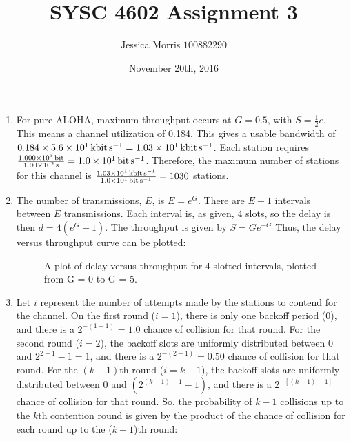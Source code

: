 \documentclass{article}
\title{SYSC 4602 Assignment 3}
\date{November 20th, 2016}
\author{Jessica Morris \(100882290\)}
\begin{document}
\maketitle

\begin{enumerate}

\item For pure ALOHA, maximum throughput occurs at $ G = 0.5 $, with $ S = \frac{1}{2}e $. This means a channel utilization of 0.184. This gives a usable bandwidth of $ 0.184 \times \SI{56}{\kilo\bit\per\second} = \SI{10.3}{\kilo\bit\per\second} $.
Each station requires $ \frac{\SI{1000}{\bit}}{\SI{100}{\second}} = \SI{10}{\bit\per\second} $. Therefore, the maximum number of stations for this channel is $ \frac{\SI{10.3}{\kilo\bit\per\second}}{\SI{10}{\bit\per\second}} = 1030 $ stations.

\item The number of transmissions, $ E $, is $ E = e^G $. There are $ E - 1 $ intervals between $ E $ transmissions. Each interval is, as given, 4 slots, so the delay is then $ d = 4(e^G - 1) $. The throughput is given by $ S = Ge^{-G} $ Thus, the delay versus throughput curve can be plotted:

\begin{figure}[!ht]
\centering
{}
\caption{A plot of delay versus throughput for 4-slotted intervals, plotted from G = 0 to G = 5.}
\end{figure}

%

\item Let $ i $ represent the number of attempts made by the stations to contend for the channel. On the first round ($ i = 1 $), there is only one backoff period (0), and there is a $ 2^{-(1-1)} = 1.0 $ chance of collision for that round. For the second round ($ i = 2 $), the backoff slots are uniformly distributed between 0 and $ 2^{2-1} - 1 = 1 $, and there is a $ 2^{-(2-1)} = 0.50 $ chance of collision for that round. For the $ (k - 1) $th round ($ i = k-1 $), the backoff slots are uniformly distributed between 0 and $ (2^{(k-1)-1} - 1) $, and there is a $ 2^{-[(k-1)-1]} $ chance of collision for that round. So, the probability of $ k-1 $ collisions up to the $ k $th contention round is given by the product of the chance of collision for each round up to the ($ k -1 $)th round:


\end{enumerate}
\end{document}
